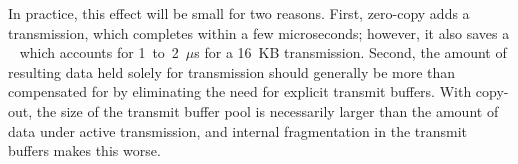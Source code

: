 In practice, this effect will be small for two reasons. First, zero-copy adds a
transmission, which completes within a few microseconds; however, it also saves a
\memcpy~ which accounts for 1~to~2~$\mu$s for a 16~KB transmission. Second, the
amount of resulting data held solely for transmission should generally be
more than compensated for by eliminating the need for explicit transmit
buffers. With copy-out, the size of the transmit buffer pool is necessarily
larger than the amount of data under active transmission, and internal
fragmentation in the transmit buffers makes this worse.


